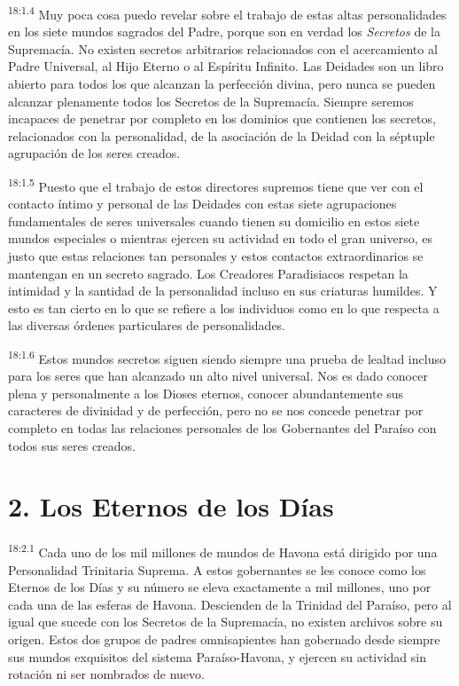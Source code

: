 \par
\textsuperscript{18:1.4} Muy poca cosa puedo revelar sobre el trabajo de estas altas personalidades en los siete mundos sagrados del Padre, porque son en verdad los \textit{Secretos} de la Supremacía. No existen secretos arbitrarios relacionados con el acercamiento al Padre Universal, al Hijo Eterno o al Espíritu Infinito. Las Deidades son un libro abierto para todos los que alcanzan la perfección divina, pero nunca se pueden alcanzar plenamente todos los Secretos de la Supremacía. Siempre seremos incapaces de penetrar por completo en los dominios que contienen los secretos, relacionados con la personalidad, de la asociación de la Deidad con la séptuple agrupación de los seres creados.

\par
\textsuperscript{18:1.5} Puesto que el trabajo de estos directores supremos tiene que ver con el contacto íntimo y personal de las Deidades con estas siete agrupaciones fundamentales de seres universales cuando tienen su domicilio en estos siete mundos especiales o mientras ejercen su actividad en todo el gran universo, es justo que estas relaciones tan personales y estos contactos extraordinarios se mantengan en un secreto sagrado. Los Creadores Paradisiacos respetan la intimidad y la santidad de la personalidad incluso en sus criaturas humildes. Y esto es tan cierto en lo que se refiere a los individuos como en lo que respecta a las diversas órdenes particulares de personalidades.

\par
\textsuperscript{18:1.6} Estos mundos secretos siguen siendo siempre una prueba de lealtad incluso para los seres que han alcanzado un alto nivel universal. Nos es dado conocer plena y personalmente a los Dioses eternos, conocer abundantemente sus caracteres de divinidad y de perfección, pero no se nos concede penetrar por completo en todas las relaciones personales de los Gobernantes del Paraíso con todos sus seres creados.

\section*{2. Los Eternos de los Días}
\par
\textsuperscript{18:2.1} Cada uno de los mil millones de mundos de Havona está dirigido por una Personalidad Trinitaria Suprema. A estos gobernantes se les conoce como los Eternos de los Días y su número se eleva exactamente a mil millones, uno por cada una de las esferas de Havona. Descienden de la Trinidad del Paraíso, pero al igual que sucede con los Secretos de la Supremacía, no existen archivos sobre su origen. Estos dos grupos de padres omnisapientes han gobernado desde siempre sus mundos exquisitos del sistema Paraíso-Havona, y ejercen su actividad sin rotación ni ser nombrados de nuevo.


